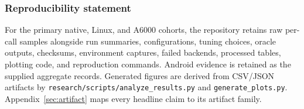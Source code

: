 \documentclass[10pt]{article}
\begin{document}
\subsubsection*{Reproducibility statement}
For the primary native, Linux, and A6000 cohorts, the repository retains raw per-call samples alongside run summaries, configurations, tuning choices, oracle outputs, checksums, environment captures, failed backends, processed tables, plotting code, and reproduction commands. Android evidence is retained as the supplied aggregate records. Generated figures are derived from CSV/JSON artifacts by \texttt{research/scripts/analyze\_results.py} and \texttt{generate\_plots.py}. Appendix~\ref{sec:artifact} maps every headline claim to its artifact family.




\appendix

\end{document}

